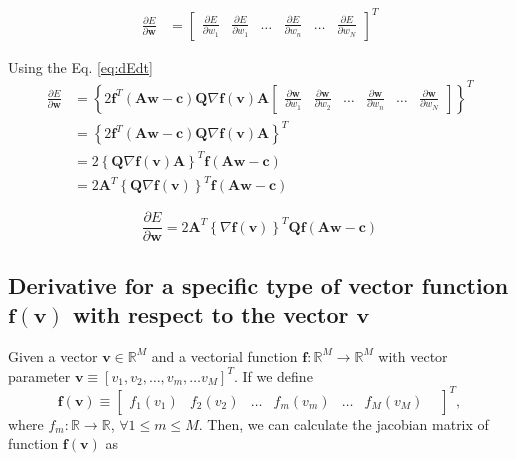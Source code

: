 \begin{align}
\frac{\partial E}{\partial \mathbf{w}}
&=
\begin{bmatrix}
\frac{\partial E}{\partial w_{1}}&
\frac{\partial E}{\partial w_{1}}&
\dots&
\frac{\partial E}{\partial w_{n}}&
\dots&
\frac{\partial E}{\partial w_{N}}
\end{bmatrix}^{T}
\end{align}

Using the Eq. \ref{eq:dEdt}
\begin{align}
\frac{\partial E}{\partial \mathbf{w}}
&=
\left\{
2
\mathbf{f}^{T}\left(\mathbf{A}\mathbf{w}-\mathbf{c}\right)\mathbf{Q}
\nabla \mathbf{f}(\mathbf{v})
\mathbf{A}
\begin{bmatrix}
\frac{\partial \mathbf{w}}{\partial w_{1}}&
\frac{\partial \mathbf{w}}{\partial w_{2}}&
\dots&
\frac{\partial \mathbf{w}}{\partial w_{n}}&
\dots&
\frac{\partial \mathbf{w}}{\partial w_{N}}
\end{bmatrix}
\right\}^{T}\\[4pt]
&=
\left\{
2
\mathbf{f}^{T}\left(\mathbf{A}\mathbf{w}-\mathbf{c}\right)\mathbf{Q}
\nabla \mathbf{f}(\mathbf{v})
\mathbf{A}
\right\}^{T}\\[4pt]
&=
2
\left\{
\mathbf{Q}
\nabla \mathbf{f}(\mathbf{v})
\mathbf{A}
\right\}^{T}
\mathbf{f}\left(\mathbf{A}\mathbf{w}-\mathbf{c}\right)\\[4pt]
&=
2
\mathbf{A}^{T}
\left\{
\mathbf{Q}
\nabla \mathbf{f}(\mathbf{v})
\right\}^{T}
\mathbf{f}\left(\mathbf{A}\mathbf{w}-\mathbf{c}\right)
\end{align}

\begin{equation}
\frac{\partial E}{\partial \mathbf{w}}
=
2
\mathbf{A}^{T}
\left\{
\nabla \mathbf{f}(\mathbf{v})
\right\}^{T}
\mathbf{Q}
\mathbf{f}\left(\mathbf{A}\mathbf{w}-\mathbf{c}\right)
\end{equation}

\subsection{Derivative for a specific type of vector function $\mathbf{f}(\mathbf{v})$ with respect to the vector $\mathbf{v}$}

Given 
a vector $\mathbf{v} \in \mathbb{R}^{M}$ and 
a vectorial function $\mathbf{f}:\mathbb{R}^{M} \to \mathbb{R}^{M}$ with vector parameter 
$\mathbf{v}\equiv \left[v_{1}, v_{2}, \dots,v_{m},\dots v_{M}\right]^{T}$.
If we define 
\begin{equation}
\mathbf{f}(\mathbf{v}) 
\equiv
\begin{bmatrix}
f_{1}(v_{1}) &
f_{2}(v_{2}) &
\dots&
f_{m}(v_{m}) &
\dots&
f_{M}(v_{M}) &
\end{bmatrix}^{T},
\end{equation}
where $f_{m}:\mathbb{R} \to \mathbb{R}$, $\forall 1 \leq m\leq M$.
Then, we can calculate the jacobian matrix of function $\mathbf{f}(\mathbf{v})$ as

